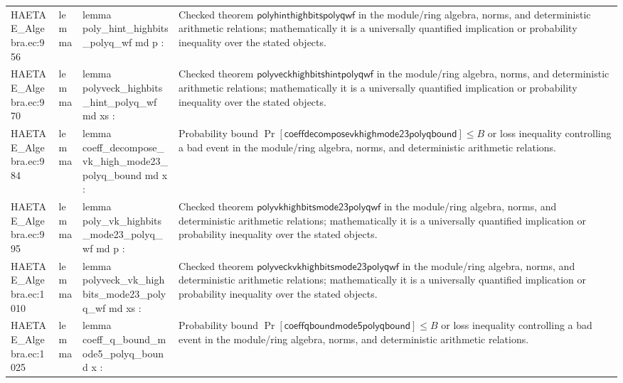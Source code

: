 \documentclass[10pt]{article}
\begin{document}
\begin{longtable}{L{0.11\textwidth}L{0.055\textwidth}L{0.385\textwidth}L{0.41\textwidth}}
HAETAE\_\allowbreak{}Algebra.\allowbreak{}ec:\allowbreak{}956 & lemma & {\ttfamily\scriptsize lemma poly\_\allowbreak{}hint\_\allowbreak{}highbits\_\allowbreak{}polyq\_\allowbreak{}wf md p :} & Checked theorem $\mathsf{polyhinthighbitspolyqwf}$ in the module/ring algebra, norms, and deterministic arithmetic relations; mathematically it is a universally quantified implication or probability inequality over the stated objects. \\
HAETAE\_\allowbreak{}Algebra.\allowbreak{}ec:\allowbreak{}970 & lemma & {\ttfamily\scriptsize lemma polyveck\_\allowbreak{}highbits\_\allowbreak{}hint\_\allowbreak{}polyq\_\allowbreak{}wf md xs :} & Checked theorem $\mathsf{polyveckhighbitshintpolyqwf}$ in the module/ring algebra, norms, and deterministic arithmetic relations; mathematically it is a universally quantified implication or probability inequality over the stated objects. \\
HAETAE\_\allowbreak{}Algebra.\allowbreak{}ec:\allowbreak{}984 & lemma & {\ttfamily\scriptsize lemma coeff\_\allowbreak{}decompose\_\allowbreak{}vk\_\allowbreak{}high\_\allowbreak{}mode23\_\allowbreak{}polyq\_\allowbreak{}bound md x :} & Probability bound $\Pr[\mathsf{coeffdecomposevkhighmode23polyqbound}]\le B$ or loss inequality controlling a bad event in the module/ring algebra, norms, and deterministic arithmetic relations. \\
HAETAE\_\allowbreak{}Algebra.\allowbreak{}ec:\allowbreak{}995 & lemma & {\ttfamily\scriptsize lemma poly\_\allowbreak{}vk\_\allowbreak{}highbits\_\allowbreak{}mode23\_\allowbreak{}polyq\_\allowbreak{}wf md p :} & Checked theorem $\mathsf{polyvkhighbitsmode23polyqwf}$ in the module/ring algebra, norms, and deterministic arithmetic relations; mathematically it is a universally quantified implication or probability inequality over the stated objects. \\
HAETAE\_\allowbreak{}Algebra.\allowbreak{}ec:\allowbreak{}1010 & lemma & {\ttfamily\scriptsize lemma polyveck\_\allowbreak{}vk\_\allowbreak{}highbits\_\allowbreak{}mode23\_\allowbreak{}polyq\_\allowbreak{}wf md xs :} & Checked theorem $\mathsf{polyveckvkhighbitsmode23polyqwf}$ in the module/ring algebra, norms, and deterministic arithmetic relations; mathematically it is a universally quantified implication or probability inequality over the stated objects. \\
HAETAE\_\allowbreak{}Algebra.\allowbreak{}ec:\allowbreak{}1025 & lemma & {\ttfamily\scriptsize lemma coeff\_\allowbreak{}q\_\allowbreak{}bound\_\allowbreak{}mode5\_\allowbreak{}polyq\_\allowbreak{}bound x :} & Probability bound $\Pr[\mathsf{coeffqboundmode5polyqbound}]\le B$ or loss inequality controlling a bad event in the module/ring algebra, norms, and deterministic arithmetic relations. \\

\end{longtable}
\end{document}
